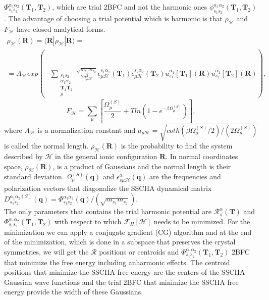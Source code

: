 $\Phi_{s_{1}s_{2}}^{\alpha_{1}\alpha_{2}}(\mathbf{T}_{1},\mathbf{T}_{2})$, which are trial 2BFC and not the harmonic ones $\phi_{s_{1}s_{2}}^{\alpha_{1}\alpha_{2}}(\mathbf{T}_{1},\mathbf{T}_{2})$. The advantage of choosing a 
trial potential which is harmonic is that $\rho_{\mathcal{H}}$ and $F_{\mathcal{H}}$ have closed analytical forms. 
\begin{multline}
 \rho_{\mathcal{H}}(\mathbf{R})=\langle\mathbf{R}|\rho_{\mathcal{H}}|\mathbf{R}\rangle=\\=A_{\mathcal{H}}exp\left(-\sum\limits_{\substack{s_{1}s_{2} \\ \alpha_{1}\alpha_{2} \\ \mathbf{T}_{1}\mathbf{T}_{2} \\ \mu}}\frac{\sqrt{
	 m_{s_{1}}m_{s_{2}}}}{2a_{\mu\mathcal{H}}^{2}}\epsilon_{\mu\mathcal{H}}^{s_{1}\alpha_{1}}(\mathbf{T}_{1})\epsilon_{\mu\mathcal{H}}^{s_{2}\alpha_{2}}(\mathbf{T}_{2})u_{s_{1}}^{\alpha_{1}}[\mathbf{T}_{1}](\mathbf{
 R})u_{s_{2}}^{\alpha_{2}}[\mathbf{T}_{2}](\mathbf{R})\right),
\end{multline}
\begin{equation}
	F_{\mathcal{H}}=\sum_{\mu}\left[\frac{\Omega^{(S)}_{\mu}}{2}+Tln\left(1-e^{-\beta\Omega^{(S)}_{\mu}}\right)\right],
\end{equation}
where $A_{\mathcal{H}}$ is a normalization constant and $a_{\mu\mathcal{H}}=\sqrt{coth(\beta\Omega^{(S)}_{\mu}/2)/(2\Omega^{(S)}_{\mu})}$ is called the normal length. $\rho_{\mathcal{H}}(\mathbf{R})$ 
is the probability to find the system described by $\mathcal{H}$ in the general ionic configuration $\mathbf{R}$. In normal coordinates space, $\rho_{\mathcal{H}}(\mathbf{R})$, is a product of Gaussians and the normal length 
is their standard deviation. $\Omega^{(S)}_{\mu}(\mathbf{q})$ and $\epsilon_{s\mu\mathcal{H}}^{\alpha}(\mathbf{q})$ are the frequencies and polarization vectors that diagonalize the SSCHA dynamical 
matrix $D_{s_{1}s_{2}}^{\alpha_{1}\alpha_{2}(S)}(\mathbf{q})=\Phi_{s_{1}s_{2}}^{\alpha_{1}\alpha_{2}}(\mathbf{q})/(\sqrt{m_{s_{1}}m_{s_{2}}})$. \\

The only parameters that contains the trial harmonic potential are $\mathcal{R}_{s}^{\alpha}(\mathbf{T})$ and $\Phi_{s_{1}s_{2}}^{\alpha_{1}\alpha_{2}}(\mathbf{T}_{1},\mathbf{T}_{2})$ with respect to 
which $\mathcal{F}_{H}[\mathcal{H}]$ needs to be minimized. For the minimization we can apply a conjugate gradient (CG) algorithm and at the end of the minimization, which is done in a subspace that 
preserves the crystal symmetries, we will get the $\boldsymbol{\mathcal{R}}$ positions or centroids and $\Phi_{s_{1}s_{2}}^{\alpha_{1}\alpha_{2}}(\mathbf{T}_{1},\mathbf{T}_{2})$ 2BFC that minimize 
the free energy including anharmonic effects. The centroid positions that minimize the SSCHA free energy are the centers of the SSCHA Gaussian wave functions and the trial 2BFC that minimize the SSCHA free 
energy provide the width of these Gaussians. \\

